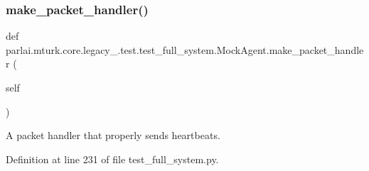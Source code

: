 \subsubsection{\texorpdfstring{make\+\_\+packet\+\_\+handler()}{make\_packet\_handler()}}
{\footnotesize\ttfamily def parlai.\+mturk.\+core.\+legacy\+\_.\+test.\+test\+\_\+full\+\_\+system.\+Mock\+Agent.\+make\+\_\+packet\+\_\+handler (\begin{DoxyParamCaption}\item[{}]{self }\end{DoxyParamCaption})}

\begin{DoxyVerb}A packet handler that properly sends heartbeats.
\end{DoxyVerb}
 

Definition at line 231 of file test\+\_\+full\+\_\+system.\+py.


